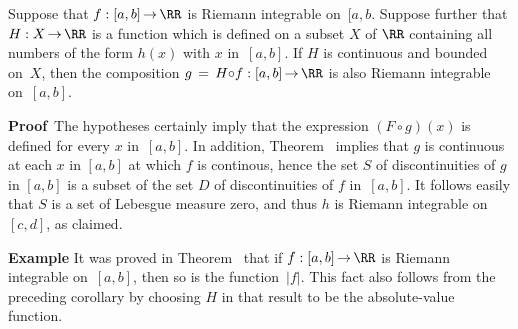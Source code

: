 \V
    Suppose that $f:[a,b] \,{\rightarrow}\, {\RR}$ is Riemann integrable on~$[a,b$.
    Suppose further that $H:X \,{\rightarrow}\, {\RR}$ is a function which is defined on a subset $X$ of ${\RR}$ containing all numbers of the form $h(x)$ with $x$ in~$[a,b]$.
    If $H$ is continuous and bounded on~$X$, then the composition $g \,=\, H{\circ}f:[a,b] \,{\rightarrow}\, {\RR}$ is also Riemann integrable on~$[a,b]$.

\V

        {\bf Proof}\, The hypotheses certainly imply that the expression $(F{\circ}g)(x)$ is defined for every $x$ in~$[a,b]$.
    In addition, Theorem~ implies that $g$ is continuous at each $x$ in $[a,b]$ at which $f$ is continous,
    hence the set $S$ of discontinuities of $g$ in $[a,b]$ is a subset of the set $D$ of discontinuities of $f$ in~$[a,b]$.
    It follows easily that $S$ is a set of Lebesgue measure zero, and thus $h$ is Riemann integrable on~$[c,d]$, as claimed.

\VV

        {\bf Example} It was proved in Theorem~ that if $f:[a,b] \,{\rightarrow}\, {\RR}$ is Riemann integrable on~$[a,b]$,
    then so is the function~$|f|$. This fact also follows from the preceding corollary by choosing $H$  in that result to be the absolute-value function.


\VV

